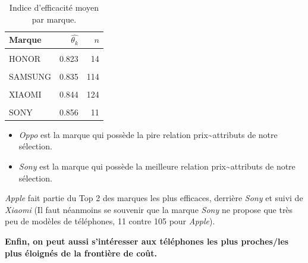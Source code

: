 \documentclass[
  12pt,
]{report}
\providecommand{\tightlist}{%
  \setlength{\itemsep}{0pt}\setlength{\parskip}{0pt}}\usepackage{longtable,booktabs,array}
\begin{document}
\begin{table}[!h]

\caption{\label{tab:eff_brands}Indice d'efficacité moyen par marque.}
\centering
\begin{tabular}[t]{lrr}
\toprule
\textbf{Marque} & \textbf{$\hat{\theta_k}$} & \textbf{$n$}\\
\midrule
\cellcolor{gray!6}{OPPO} & \cellcolor{gray!6}{0.817} & \cellcolor{gray!6}{6}\\
HONOR & 0.823 & 14\\
\cellcolor{gray!6}{MOTOROLA} & \cellcolor{gray!6}{0.824} & \cellcolor{gray!6}{36}\\
SAMSUNG & 0.835 & 114\\
\cellcolor{gray!6}{GOOGLE} & \cellcolor{gray!6}{0.842} & \cellcolor{gray!6}{23}\\
\addlinespace
XIAOMI & 0.844 & 124\\
\cellcolor{gray!6}{APPLE} & \cellcolor{gray!6}{0.848} & \cellcolor{gray!6}{104}\\
SONY & 0.856 & 11\\
\bottomrule
\end{tabular}
\end{table}

\newpage

\begin{itemize}
\tightlist
\item
  \emph{Oppo} est la marque qui possède la pire relation
  prix\textasciitilde attributs de notre sélection.
\item
  \emph{Sony} est la marque qui possède la meilleure relation
  prix\textasciitilde attributs de notre sélection.
\end{itemize}

\emph{Apple} fait partie du Top 2 des marques les plus efficaces,
derrière \emph{Sony} et suivi de \emph{Xiaomi} (Il faut néanmoins se
souvenir que la marque \emph{Sony} ne propose que très peu de modèles de
téléphones, 11 contre 105 pour \emph{Apple}).

\textbf{Enfin, on peut aussi s'intéresser aux téléphones les plus
proches/les plus éloignés de la frontière de coût.}
\end{document}
